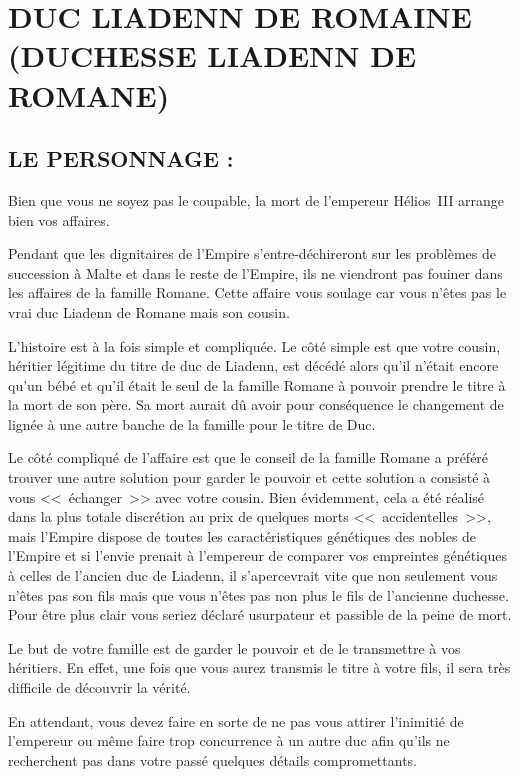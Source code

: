 \documentclass[14pt,twocolumn]{extarticle}
\begin{document}
\section{DUC LIADENN DE ROMAINE\\(DUCHESSE LIADENN DE ROMANE)}

\subsection{LE PERSONNAGE :}

Bien que vous ne soyez pas le coupable, la mort de l'empereur Hélios~III
arrange bien vos affaires.

Pendant que les dignitaires de l'Empire s'entre-déchireront sur les problèmes
de succession à Malte et dans le reste de l'Empire, ils ne viendront pas
fouiner dans les affaires de la famille Romane. Cette affaire vous soulage car
vous n'êtes pas le vrai duc Liadenn de Romane mais son cousin.

L'histoire est à la fois simple et compliquée. Le côté simple est que votre
cousin, héritier légitime du titre de duc de Liadenn, est décédé alors qu'il
n'était encore qu'un bébé et qu'il était le seul de la famille Romane à pouvoir
prendre le titre à la mort de son père. Sa mort aurait dû avoir pour
conséquence le changement de lignée à une autre banche de la famille pour le
titre de Duc.

Le côté compliqué de l'affaire est que le conseil de la famille Romane a
préféré trouver une autre solution pour garder le pouvoir et cette solution a
consisté à vous <<~échanger~>> avec votre cousin. Bien évidemment, cela a été
réalisé dans la plus totale discrétion au prix de quelques morts
<<~accidentelles~>>, mais l'Empire dispose de toutes les caractéristiques
génétiques des nobles de l'Empire et si l'envie prenait à l'empereur de
comparer vos empreintes génétiques à celles de l'ancien duc de Liadenn, il
s'apercevrait vite que non seulement vous n'êtes pas son fils mais que vous
n'êtes pas non plus le fils de l'ancienne duchesse. Pour être plus clair vous
seriez déclaré usurpateur et passible de la peine de mort.

Le but de votre famille est de garder le pouvoir et de le transmettre à vos
héritiers. En effet, une fois que vous aurez transmis le titre à votre fils, il
sera très difficile de découvrir la vérité.

En attendant, vous devez faire en sorte de ne pas vous attirer l'inimitié de
l'empereur ou même faire trop concurrence à un autre duc afin qu'ils ne
recherchent pas dans votre passé quelques détails compromettants.
\end{document}
